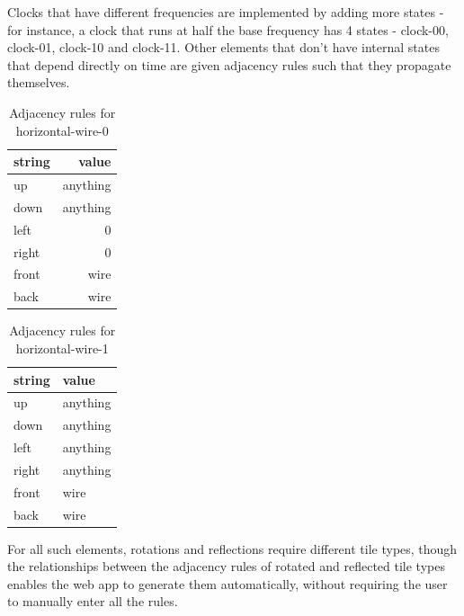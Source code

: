\documentclass[letterpaper,11pt]{article}
\begin{document}
	Clocks that have different frequencies are implemented by adding more states - for instance, a clock that runs at half the base frequency has 4 states - clock-00, clock-01, clock-10 and clock-11. Other elements that don't have internal states that depend directly on time are given adjacency rules such that they propagate themselves.

	\begin{table}[h!tbp]
		\centering
		\caption{Adjacency rules for horizontal-wire-0}
		{\footnotesize %
		\begin{tabular}{|l|r|}
		\hline
		  string & value \\
		\hline
		up & anything \\
		\hline
		down & anything \\
		\hline
		left & 0 \\
		\hline
		right & 0 \\
		\hline
		front & wire \\
		\hline
		back & wire \\
		\hline
		\end{tabular}
		}
		\end{table}
	
		\begin{table}[h!tbp]
			\centering
			\caption{Adjacency rules for horizontal-wire-1}
			{\footnotesize %
			\begin{tabular}{|l|l|}
			\hline
			  string & value \\
			\hline
			up & anything \\
			\hline
			down & anything \\
			\hline
			left & anything \\
			\hline
			right & anything \\
			\hline
			front & wire \\
			\hline
			back & wire \\
			\hline
			\end{tabular}
			}
			\end{table}

For all such elements, rotations and reflections require different tile types, though the relationships between the adjacency rules of rotated and reflected tile types enables the web app to generate them automatically, without requiring the user to manually enter all the rules.
\end{document}
